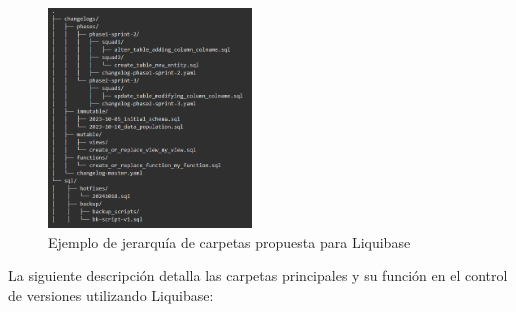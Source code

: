 \documentclass{IEEEtran}
\begin{document}
\begin{figure}[H]
    \centering
    \includegraphics[width=0.48\textwidth]{images/folderHerarchyLiquibase.png}
    \caption{Ejemplo de jerarquía de carpetas propuesta para Liquibase}
    \label{fig:folderHerarchyLiquibase}
\end{figure}

 La siguiente descripción detalla las carpetas principales y su función en el control de versiones utilizando Liquibase:
\end{document}
